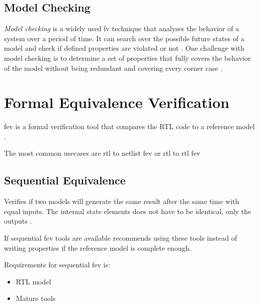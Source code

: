 \subsection{Model Checking}

\textit{Model checking} is a widely used \acrshort{fv} technique that analyses the behavior of a system over a period of time. It can search over the possible future states of a model and check if defined properties are violated or not \cite{seligmanFormalVerificationEssential2015}. One challenge with model checking is to determine a set of properties that fully covers the behavior of the model without being redundant and covering every corner case \cite{castromarquezFormalEquivalenceChecking2013}.

\section{Formal Equivalence Verification}

\acrfull{fev} is a formal verification tool that compares the RTL code to a reference model \cite{seligmanFormalVerificationEssential2015}.

The most common usecases are \acrshort{rtl} to netlist \acrshort{fev} or \acrshort{rtl} to \acrshort{rtl} \acrshort{fev}

\subsection{Sequential Equivalence}

Verifies if two models will generate the same result after the same time with equal inputs. The internal state elements does not have to be identical, only the outputs \cite{seligmanFormalVerificationEssential2015}.

If sequential \acrshort{fev} tools are available \textcite{seligmanFormalVerificationEssential2015} recommends using these tools instead of writing properties if the reference model is complete enough.

Requirements for sequential \acrshort{fev} is:
\begin{itemize}
    \item RTL model
    \item Mature tools
\end{itemize}





